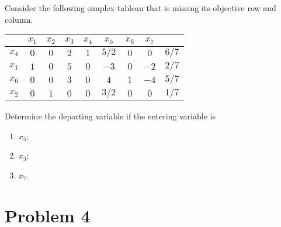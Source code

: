 \documentclass[a4paper, 12pt]{article}
\numberwithin{equation}{section}
\numberwithin{figure}{section}
\theoremstyle{definition}
\begin{document}
Consider the following simplex tableau that is missing its objective row and
column.

\begin{center}
    \begin{tabular}{|c|ccccccc|c|}
        \hline
        & $x_1$ & $x_2$ & $x_3$ & $x_4$ & $x_5$ & $x_6$ & $x_7$ & \\ \hline
        $x_4$ & $0$ & $0$ & $2$ & $1$ & $5/2$ & $0$ & $0$ & $6/7$ \\ 
        $x_1$ & $1$ & $0$ & $5$ & $0$ & $-3$ & $0$ & $-2$ & $2/7$ \\ 
        $x_6$ & $0$ & $0$ & $3$ & $0$ & $4$ & $1$ & $-4$ & $5/7$ \\ 
        $x_2$ & $0$ & $1$ & $0$ & $0$ & $3/2$ & $0$ & $0$ & $1/7$ \\ \hline
    \end{tabular}
\end{center}

Determine the departing variable if the entering variable is
\begin{enumerate}[label=$(\roman*)$]
    \item $x_5$;
    \item $x_3$;
    \item $x_7$.
\end{enumerate}

\section*{Problem 4}
\end{document}
